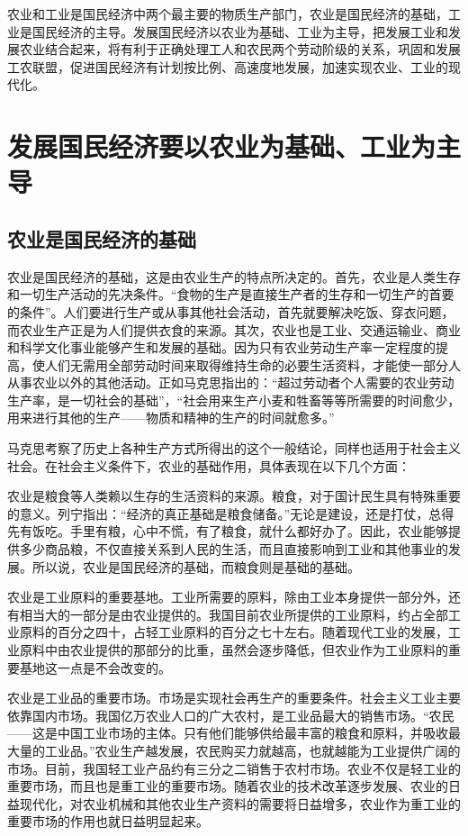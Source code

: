 \documentclass{book}
\begin{document}
农业和工业是国民经济中两个最主要的物质生产部门，农业是国民经济的基础，工业是国民经济的主导。发展国民经济以农业为基础、工业为主导，把发展工业和发展农业结合起来，将有利于正确处理工人和农民两个劳动阶级的关系，巩固和发展工农联盟，促进国民经济有计划按比例、高速度地发展，加速实现农业、工业的现代化。

\section{发展国民经济要以农业为基础、工业为主导}

\subsection{农业是国民经济的基础}

农业是国民经济的基础，这是由农业生产的特点所决定的。首先，农业是人类生存和一切生产活动的先决条件。“食物的生产是直接生产者的生存和一切生产的首要的条件”。人们要进行生产或从事其他社会活动，首先就要解决吃饭、穿衣问题，而农业生产正是为人们提供衣食的来源。其次，农业也是工业、交通运输业、商业和科学文化事业能够产生和发展的基础。因为只有农业劳动生产率一定程度的提高，使人们无需用全部劳动时间来取得维持生命的必要生活资料，才能使一部分人从事农业以外的其他活动。正如马克思指出的：“超过劳动者个人需要的农业劳动生产率，是一切社会的基础”，“社会用来生产小麦和牲畜等等所需要的时间愈少，用来进行其他的生产——物质和精神的生产的时间就愈多。”

马克思考察了历史上各种生产方式所得出的这个一般结论，同样也适用于社会主义社会。在社会主义条件下，农业的基础作用，具体表现在以下几个方面：

农业是粮食等人类赖以生存的生活资料的来源。粮食，对于国计民生具有特殊重要的意义。列宁指出：“经济的真正基础是粮食储备。”无论是建设，还是打仗，总得先有饭吃。手里有粮，心中不慌，有了粮食，就什么都好办了。因此，农业能够提供多少商品粮，不仅直接关系到人民的生活，而且直接影响到工业和其他事业的发展。所以说，农业是国民经济的基础，而粮食则是基础的基础。

农业是工业原料的重要基地。工业所需要的原料，除由工业本身提供一部分外，还有相当大的一部分是由农业提供的。我国目前农业所提供的工业原料，约占全部工业原料的百分之四十，占轻工业原料的百分之七十左右。随着现代工业的发展，工业原料中由农业提供的那部分的比重，虽然会逐步降低，但农业作为工业原料的重要基地这一点是不会改变的。

农业是工业品的重要市场。市场是实现社会再生产的重要条件。社会主义工业主要依靠国内市场。我国亿万农业人口的广大农村，是工业品最大的销售市场。“农民——这是中国工业市场的主体。只有他们能够供给最丰富的粮食和原料，并吸收最大量的工业品。”农业生产越发展，农民购买力就越高，也就越能为工业提供广阔的市场。目前，我国轻工业产品约有三分之二销售于农村市场。农业不仅是轻工业的重要市场，而且也是重工业的重要市场。随着农业的技术改革逐步发展、农业的日益现代化，对农业机械和其他农业生产资料的需要将日益增多，农业作为重工业的重要市场的作用也就日益明显起来。
\end{document}
